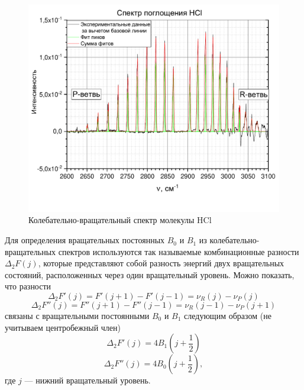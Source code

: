 \begin{figure}[H]
	\centering
	\includegraphics[angle = 90, height=0.88\textheight]{data/HCl_peaks}
	\caption{Колебательно-вращательный спектр молекулы HCl}
	\label{HCL_spec}
\end{figure}


Для определения вращательных постоянных $B_0$ и $B_1$ из
колебательно-вращательных спектров используются так называемые
комбинационные разности $\Delta_2F(j)$, которые представляют собой разность энергий двух вращательных состояний, расположенных через
один вращательный уровень. Можно показать, что разности
\begin{equation}
\label{eq:deltaF'}
\Delta_2F'(j)=F'(j+1)-F'(j-1)=\nu_R(j)-\nu_P(j)
\end{equation}
\begin{equation}
\label{eq:deltaF''}
\Delta_2F''(j)=F''(j+1)-F''(j-1)=\nu_R(j-1)-\nu_P(j+1)
\end{equation}
связаны с вращательными постоянными $B_0$ и $B_1$ следующим образом (не учитываем центробежный член)
\begin{equation}
\label{eq:deltaF'B}
\Delta_2F'(j)=4B_1(j+\frac{1}{2})
\end{equation}
\begin{equation}
\label{eq:deltaF''B}
\Delta_2F''(j)=4B_0(j+\frac{1}{2}),
\end{equation}
где $j$ --- нижний вращательный уровень.

